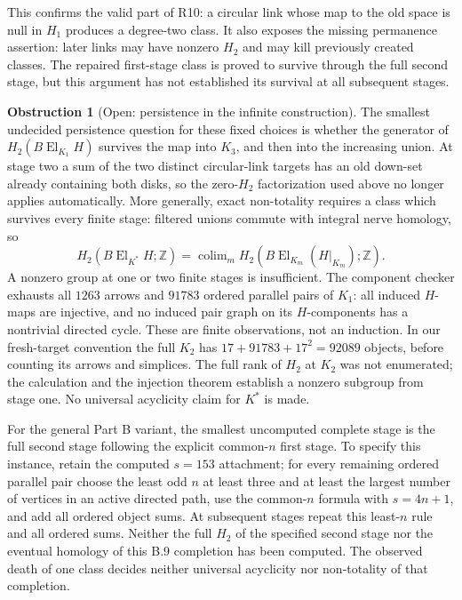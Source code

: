 \documentclass[11pt,a4paper]{article}
\theoremstyle{definition}
\newtheorem{obstruction}[theorem]{Obstruction}
\begin{document}
This confirms the valid part of R10: a circular link whose map to the
old space is null in $H_1$ produces a degree-two class.  It also exposes
the missing permanence assertion: later links may have nonzero $H_2$
and may kill previously created classes.  The repaired first-stage
class is proved to survive through the full second stage, but this
argument has not established its survival at all subsequent stages.

\begin{obstruction}[Open: persistence in the infinite construction]\label{C:open}
The smallest undecided persistence question for these fixed choices is
whether the generator of $H_2(B\operatorname{El}_{K_1}H)$ survives the
map into $K_3$, and then into the increasing union.  At stage two a
sum of the two distinct circular-link targets has an old down-set
already containing both disks, so the zero-$H_2$ factorization used
above no longer applies automatically.  More generally, exact
non-totality requires a class which survives every finite stage:
filtered unions commute with integral nerve homology, so
\[
 H_2(B\operatorname{El}_{K^*}H;\mathbb Z)
   =\operatorname{colim}_m
        H_2(B\operatorname{El}_{K_m}(H|_{K_m});\mathbb Z).
\]
A nonzero group at one or two finite stages is insufficient.
The component checker exhausts all $1263$ arrows and $91783$ ordered parallel pairs of $K_1$: all induced $H$-maps are injective, and no induced pair graph on its $H$-components has a nontrivial directed cycle. These are finite observations, not an induction. In our fresh-target convention the full $K_2$ has $17+91783+17^2=92089$ objects, before counting its arrows and simplices. The full rank of $H_2$ at $K_2$ was not enumerated; the calculation and
the injection theorem establish a nonzero subgroup from stage one.
No universal acyclicity claim for $K^*$ is made.

For the general Part B variant, the smallest uncomputed complete stage
is the full second stage following the explicit common-$n$ first stage.
To specify this instance, retain the computed $s=153$ attachment;
for every remaining ordered parallel pair choose the least odd $n$
at least three and at least the largest number of vertices in an
active directed path, use the common-$n$ formula with $s=4n+1$,
and add all ordered object sums. At subsequent stages repeat this
least-$n$ rule and all ordered sums. Neither the full $H_2$ of the
specified second stage nor the eventual homology of this B.9 completion
has been computed. The observed death of one class decides neither
universal acyclicity nor non-totality of that completion.
\end{obstruction}
\end{document}
